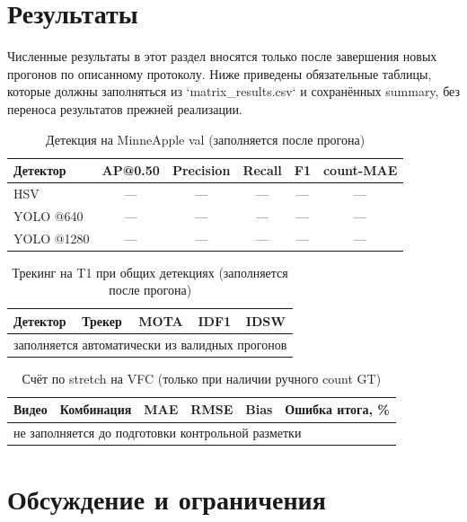 \documentclass[12pt,a4paper]{article}
\begin{document}
\section{Результаты}

Численные результаты в этот раздел вносятся только после завершения новых
прогонов по описанному протоколу. Ниже приведены обязательные таблицы,
которые должны заполняться из `matrix\_results.csv` и сохранённых summary,
без переноса результатов прежней реализации.

\begin{table}[htbp]
\centering
\caption{Детекция на MinneApple val (заполняется после прогона)}
\label{tab:detection}
\begin{tabular}{lccccc}
\hline
Детектор & AP@0.50 & Precision & Recall & F1 & count-MAE \\
\hline
HSV & --- & --- & --- & --- & --- \\
YOLO @640 & --- & --- & --- & --- & --- \\
YOLO @1280 & --- & --- & --- & --- & --- \\
\hline
\end{tabular}
\end{table}

\begin{table}[htbp]
\centering
\caption{Трекинг на T1 при общих детекциях (заполняется после прогона)}
\label{tab:mot}
\begin{tabular}{llccc}
\hline
Детектор & Трекер & MOTA & IDF1 & IDSW \\
\hline
\multicolumn{5}{l}{заполняется автоматически из валидных прогонов}\\
\hline
\end{tabular}
\end{table}

\begin{table}[htbp]
\centering
\caption{Счёт по stretch на VFC (только при наличии ручного count GT)}
\label{tab:count}
\begin{tabular}{llcccc}
\hline
Видео & Комбинация & MAE & RMSE & Bias & Ошибка итога, \% \\
\hline
\multicolumn{6}{l}{не заполняется до подготовки контрольной разметки}\\
\hline
\end{tabular}
\end{table}

\section{Обсуждение и ограничения}
\end{document}
